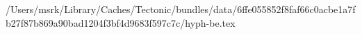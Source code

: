 /Users/msrk/Library/Caches/Tectonic/bundles/data/6ffe055852f8faf66c0acbe1a7fb27f87b869a90bad1204f3bf4d9683f597c7c/hyph-be.tex